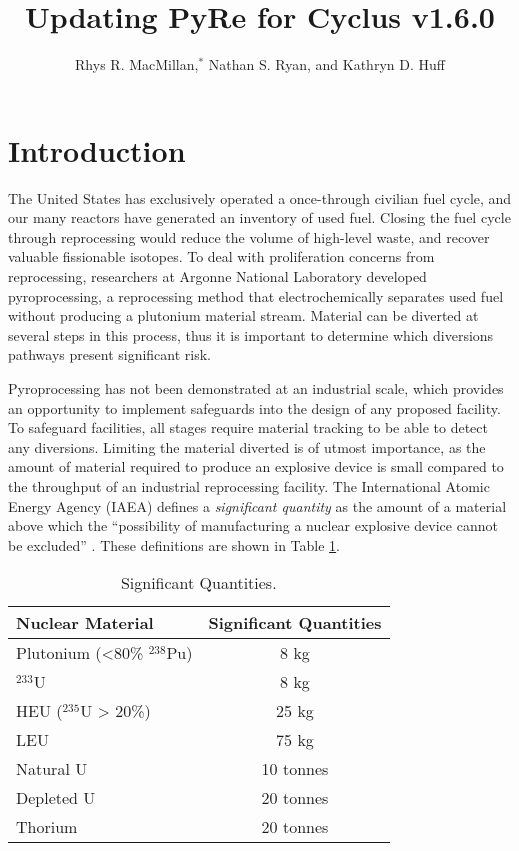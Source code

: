\documentclass{anstrans}
\title{Updating PyRe for Cyclus v1.6.0}
\author{Rhys R. MacMillan,$^{*}$ Nathan S. Ryan, and Kathryn D. Huff}
\institute{
Advanced Reactors and Fuel Cycles Group, University of Illinois, Urbana IL\\
$^{*}$rhysrm2@illinois.edu
}
\begin{document}
\section{Introduction}
The United States has exclusively operated a once-through civilian fuel cycle, and our many reactors have generated an inventory of used fuel. Closing the fuel cycle through reprocessing would reduce the volume of high-level waste, and recover valuable fissionable isotopes. To deal with proliferation concerns from reprocessing, researchers at Argonne National Laboratory developed pyroprocessing, a reprocessing method that electrochemically separates used fuel without producing a plutonium material stream. Material can be diverted at several steps in this process, thus it is important to determine which diversions pathways present significant risk.

Pyroprocessing has not been demonstrated at an industrial scale, which provides an opportunity to implement safeguards into the design of any proposed facility. To safeguard facilities, all stages require material tracking to be able to detect any diversions. Limiting the material diverted is of utmost importance, as the amount of material required to produce an explosive device is small compared to the throughput of an industrial reprocessing facility. The International Atomic Energy Agency (IAEA) defines a \emph{significant quantity} as the amount of a material above which the “possibility of manufacturing a nuclear explosive device cannot be excluded” \cite{schanfein_iaea_2021}. These definitions are shown in Table \ref{tab:sig_quant}.

\begin{table}[H]
  \centering
  \caption{Significant Quantities.}
  \label{tab:sig_quant}
  \begin{tabular}{l c}
    \hline
    Nuclear Material&Significant Quantities\\
    \hline
    Plutonium (<80\% $^{238}$Pu)&8 kg\\
    $^{233}$U&8 kg\\
    HEU ($^{235}$U > 20\%)&25 kg\\
    LEU&75 kg\\
    Natural U&10 tonnes\\
    Depleted U&20 tonnes\\
    Thorium&20 tonnes\\
    \hline
  \end{tabular}
\end{table}
\end{document}
